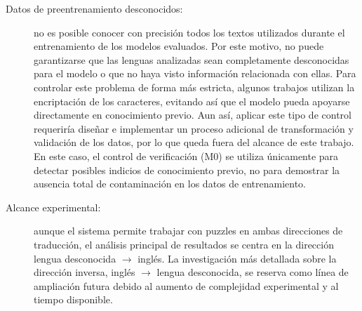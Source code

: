 \begin{description}
	\item[Datos de preentrenamiento desconocidos:] no es posible conocer con precisión todos los textos utilizados durante el entrenamiento de los modelos evaluados. Por este motivo, no puede garantizarse que las lenguas analizadas sean completamente desconocidas para el modelo o que no haya visto información relacionada con ellas. Para controlar este problema de forma más estricta, algunos trabajos utilizan la encriptación de los caracteres, evitando así que el modelo pueda apoyarse directamente en conocimiento previo. Aun así, aplicar este tipo de control requeriría diseñar e implementar un proceso adicional de transformación y validación de los datos, por lo que queda fuera del alcance de este trabajo. En este caso, el control de verificación (M0) se utiliza únicamente para detectar posibles indicios de conocimiento previo, no para demostrar la ausencia total de contaminación en los datos de entrenamiento.
	
	\item[Alcance experimental:] aunque el sistema permite trabajar con puzzles en ambas direcciones de traducción, el análisis principal de resultados se centra en la dirección lengua desconocida $\rightarrow$ inglés. La investigación más detallada sobre la dirección inversa, inglés $\rightarrow$ lengua desconocida, se reserva como línea de ampliación futura debido al aumento de complejidad experimental y al tiempo disponible.
	
\end{description}